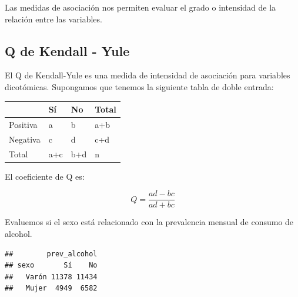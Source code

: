 \documentclass[spanish,]{book}
\newenvironment{Shaded}{\begin{snugshade}}{\end{snugshade}}
\newcommand{\KeywordTok}[1]{\textcolor[rgb]{0.13,0.29,0.53}{\textbf{#1}}}
\newcommand{\DataTypeTok}[1]{\textcolor[rgb]{0.13,0.29,0.53}{#1}}
\newcommand{\StringTok}[1]{\textcolor[rgb]{0.31,0.60,0.02}{#1}}
\newcommand{\OperatorTok}[1]{\textcolor[rgb]{0.81,0.36,0.00}{\textbf{#1}}}
\newcommand{\NormalTok}[1]{#1}
\begin{document}
Las medidas de asociación nos permiten evaluar el grado o intensidad de
la relación entre las variables.

\subsection{Q de Kendall - Yule}\label{q-de-kendall---yule}

El Q de Kendall-Yule es una medida de intensidad de asociación para
variables dicotómicas. Supongamos que tenemos la siguiente tabla de
doble entrada:

\begin{tabular}{l|l|l|l}
\hline
  & Sí & No & Total\\
\hline
Positiva & a & b & a+b\\
\hline
Negativa & c & d & c+d\\
\hline
Total & a+c & b+d & n\\
\hline
\end{tabular}

El coeficiente de Q es:

\[
Q = \frac{ad - bc}{ad + bc}
\]

Evaluemos si el sexo está relacionado con la prevalencia mensual de
consumo de alcohol.

\begin{Shaded}
\end{Shaded}

\begin{verbatim}
##        prev_alcohol
## sexo       Sí    No
##   Varón 11378 11434
##   Mujer  4949  6582
\end{verbatim}
\end{document}
